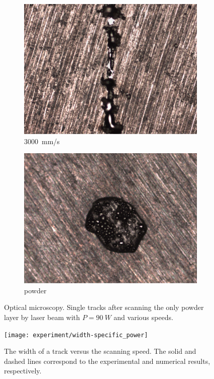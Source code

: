\documentclass{article}
\begin{document}
\begin{figure}
\begin{subfigure}[b]{0.24\textwidth}
        \includegraphics[width=\textwidth]{experiment/photos/90W_V3000}
        \caption{\SI{3000}{mm/s}}
    \end{subfigure}\:
    \begin{subfigure}[b]{0.24\textwidth}
        \includegraphics[width=\textwidth]{experiment/photos/powder}
        \caption{powder}
    \end{subfigure}
    \caption{
        Optical microscopy.
        Single tracks after scanning the only powder layer by laser beam
        with \(P=\SI{90}{W}\) and various speeds.
    }
    \label{fig:3d:experiment}
\end{figure}

\begin{figure}
    \centering
    \texttt{[image: experiment/width-specific\_power]}
    \caption{
        The width of a track versus the scanning speed.
        The solid and dashed lines correspond to the experimental and numerical results, respectively.
    }\label{fig:3d:width}
\end{figure}
\end{document}
